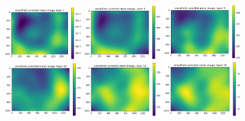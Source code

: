 \documentclass[letterpaper,11pt]{article}
\begin{document}
\begin{figure}[!ht]
\centering
\includegraphics[width=0.3\textwidth]{images/results/smoothed_corrected_mean_image_layers_vectra/smoothed_corrected_mean_image_layer_1}
\includegraphics[width=0.3\textwidth]{images/results/smoothed_corrected_mean_image_layers_vectra/smoothed_corrected_mean_image_layer_5}
\includegraphics[width=0.3\textwidth]{images/results/smoothed_corrected_mean_image_layers_vectra/smoothed_corrected_mean_image_layer_9}
\includegraphics[width=0.3\textwidth]{images/results/smoothed_corrected_mean_image_layers_vectra/smoothed_corrected_mean_image_layer_10}
\includegraphics[width=0.3\textwidth]{images/results/smoothed_corrected_mean_image_layers_vectra/smoothed_corrected_mean_image_layer_14}
\includegraphics[width=0.3\textwidth]{images/results/smoothed_corrected_mean_image_layers_vectra/smoothed_corrected_mean_image_layer_18}

\end{figure}
\end{document}

